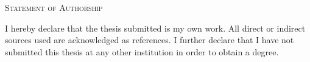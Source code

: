 \documentclass[12pt, openright, oneside, a4paper, english]{abntex2}
\renewcommand{\ABNTEXchapterfont}{\fontfamily{ptm}\fontseries{b}\selectfont}
\begin{document}
\frenchspacing 

\pretextual

\imprimircapa
\cleardoublepage

\imprimirfolhaderosto





%


\newpage
\begin{center}
{\ABNTEXchapterfont\Large\textsc{Statement of Authorship}}
\end{center}
%
\vspace*{1cm}
%
I hereby declare that the thesis submitted is my own work. All direct or indirect
sources used are acknowledged as references. I further declare that I have not submitted
this thesis at any other institution in order to obtain a degree. %
%





%
%

%	
%		
\end{document}
